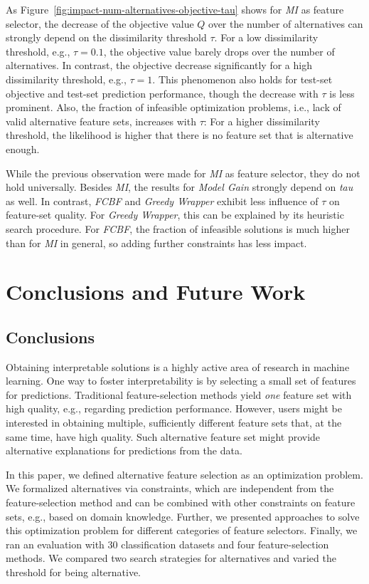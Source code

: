\documentclass{article}
\theoremstyle{definition}
\begin{document}
As Figure~\ref{fig:impact-num-alternatives-objective-tau} shows for \emph{MI} as feature selector, the decrease of the objective value $Q$ over the number of alternatives can strongly depend on the dissimilarity threshold $\tau$.
For a low dissimilarity threshold, e.g., $\tau=0.1$, the objective value barely drops over the number of alternatives.
In contrast, the objective decrease significantly for a high dissimilarity threshold, e.g., $\tau=1$.
This phenomenon also holds for test-set objective and test-set prediction performance, though the decrease with $\tau$ is less prominent.
Also, the fraction of infeasible optimization problems, i.e., lack of valid alternative feature sets, increases with $\tau$:
For a higher dissimilarity threshold, the likelihood is higher that there is no feature set that is alternative enough.

While the previous observation were made for \emph{MI} as feature selector, they do not hold universally.
Besides \emph{MI}, the results for \emph{Model Gain} strongly depend on \emph{tau} as well.
In contrast, \emph{FCBF} and \emph{Greedy Wrapper} exhibit less influence of $\tau$ on feature-set quality.
For \emph{Greedy Wrapper}, this can be explained by its heuristic search procedure.
For \emph{FCBF}, the fraction of infeasible solutions is much higher than for \emph{MI} in general, so adding further constraints has less impact.

\section{Conclusions and Future Work}
\label{sec:conclusion}

\subsection{Conclusions}

Obtaining interpretable solutions is a highly active area of research in machine learning.
One way to foster interpretability is by selecting a small set of features for predictions.
Traditional feature-selection methods yield \emph{one} feature set with high quality, e.g., regarding prediction performance.
However, users might be interested in obtaining multiple, sufficiently different feature sets that, at the same time, have high quality.
Such alternative feature set might provide alternative explanations for predictions from the data.

In this paper, we defined alternative feature selection as an optimization problem.
We formalized alternatives via constraints, which are independent from the feature-selection method and can be combined with other constraints on feature sets, e.g., based on domain knowledge.
Further, we presented approaches to solve this optimization problem for different categories of feature selectors.
Finally, we ran an evaluation with 30 classification datasets and four feature-selection methods.
We compared two search strategies for alternatives and varied the threshold for being alternative.
\end{document}
